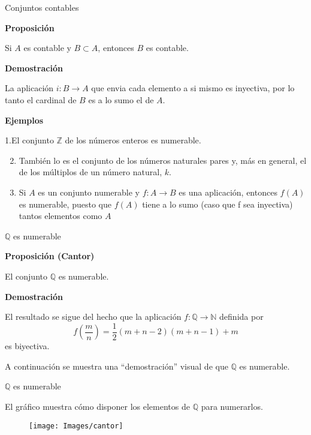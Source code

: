 \documentclass[
  ignorenonframetext,
]{beamer}
\begin{document}
\begin{frame}{Conjuntos contables}
\protect\hypertarget{conjuntos-contables}{}

\textbf{Proposición}

Si \(A\) es contable y \(B \subset A\), entonces \(B\) es contable.

\textbf{Demostración}

La aplicación \(i: B \rightarrow A\) que envia cada elemento a si mismo
es inyectiva, por lo tanto el cardinal de \(B\) es a lo sumo el de
\(A\).

\textbf{Ejemplos}

1.El conjunto \(\mathbb{Z}\) de los números enteros es numerable.

\begin{enumerate}
\setcounter{enumi}{1}
\item
  También lo es el conjunto de los números naturales pares y, más en
  general, el de los múltiplos de un número natural, \(k\).
\item
  Si \(A\) es un conjunto numerable y \(f:A \rightarrow B\) es una
  aplicación, entonces \(f(A)\) es numerable, puesto que \(f(A)\) tiene
  a lo sumo (caso que f sea inyectiva) tantos elementos como \(A\)
\end{enumerate}

\end{frame}

\begin{frame}{\(\mathbb{Q}\) es numerable}
\protect\hypertarget{mathbbq-es-numerable}{}

\textbf{Proposición (Cantor)}

El conjunto \(\mathbb{Q}\) es numerable.

\textbf{Demostración}

El resultado se sigue del hecho que la aplicación
\(f: \mathbb{Q} \rightarrow \mathbb{N}\) definida por \[
f \left(\dfrac{m}{n} \right) = \dfrac{1}{2}(m+n-2)(m+n-1)+m
\] es biyectiva.

A continuación se muestra una ``demostración'' visual de que
\(\mathbb{Q}\) es numerable.

\end{frame}

\begin{frame}{\(\mathbb{Q}\) es numerable}
\protect\hypertarget{mathbbq-es-numerable-1}{}

El gráfico muestra cómo disponer los elementos de \(\mathbb{Q}\) para
numerarlos.

\begin{figure}
\texttt{[image: Images/cantor]} \end{figure}

\end{frame}
\end{document}

